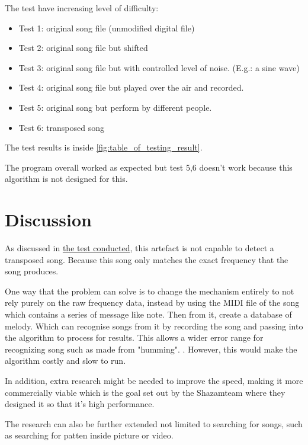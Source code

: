 The test have increasing level of difficulty:
\label{chapter:test_methods:methods}
\begin{itemize}
    \item Test 1: original song file (unmodified digital file)
    \item Test 2: original song file but shifted 
    \item Test 3: original song file but with controlled level of noise. (E.g.: a sine wave)
    \item Test 4: original song file but played over the air and recorded.
    \item Test 5: original song but perform by different people.
    \item Test 6: transposed song \label{t:test_transposed}
\end{itemize}
The test results is inside \autoref{fig:table_of_testing_result}.

The program overall worked as expected but test 5,6 doesn't work because this algorithm is not designed for this.

\chapter{Discussion}

As discussed in \hyperref[t:test_transposed]{the test conducted}, this artefact is not capable to detect a transposed song. Because this song only matches the exact frequency that the song produces. 

One way that the problem can solve is to change the mechanism entirely to not rely purely on the raw frequency data, instead by using the MIDI file of the song which contains a series of message like note. \cite{amandaghassaei_what_nodate} Then from it, create a database of melody. Which can recognise songs from it by recording the song and passing into the algorithm to process for results. This allows a wider error range for recognizing song such as made from "humming". \cite{ghias_query_1995, yang_music_2001}. However, this would make the algorithm costly and slow to run.

In addition, extra research might be needed to improve the speed, making it more commercially viable which is the goal set out by the Shazam\trademark team where they designed it so that it's high performance. \cite{wang_systems_2013}

The research can also be further extended not limited to searching for songs, such as searching for patten inside picture or video.

